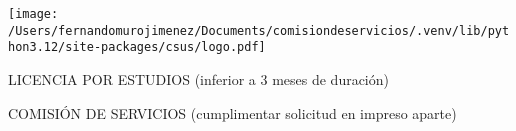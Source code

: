 \documentclass[a4paper,10pt]{article}
\begin{document}
\begin{minipage}{0.3\textwidth}
\texttt{[image:  /Users/fernandomurojimenez/Documents/comisiondeservicios/.venv/lib/python3.12/site-packages/csus/logo.pdf]}
\end{minipage}
\begin{minipage}{0.7\textwidth}

\vspace{20mm}

{\LARGE \Square} \large LICENCIA POR ESTUDIOS
\normalsize (inferior a 3 meses de duración)

\vspace{5mm}

{\LARGE \XBox} \large COMISIÓN DE SERVICIOS
\normalsize (cumplimentar
solicitud en impreso aparte)
\end{minipage}

\vspace{-2mm}
\end{document}
